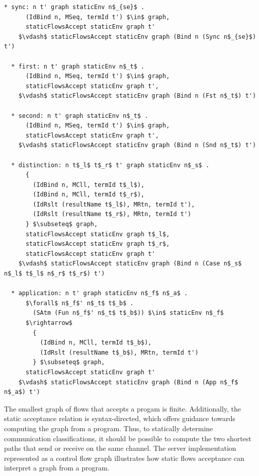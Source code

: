 \documentclass[letterpaper, 11pt]{report}
\begin{document}
\begin{lstlisting}[language=logic, mathescape]
  * sync: n t' graph staticEnv n$_{se}$ .
      (IdBind n, MSeq, termId t') $\in$ graph, 
      staticFlowsAccept staticEnv graph t'
    $\vdash$ staticFlowsAccept staticEnv graph (Bind n (Sync n$_{se}$) t')

  * first: n t' graph staticEnv n$_t$ .
      (IdBind n, MSeq, termId t') $\in$ graph, 
      staticFlowsAccept staticEnv graph t', 
    $\vdash$ staticFlowsAccept staticEnv graph (Bind n (Fst n$_t$) t')

  * second: n t' graph staticEnv n$_t$ .
      (IdBind n, MSeq, termId t') $\in$ graph, 
      staticFlowsAccept staticEnv graph t', 
    $\vdash$ staticFlowsAccept staticEnv graph (Bind n (Snd n$_t$) t')

  * distinction: n t$_l$ t$_r$ t' graph staticEnv n$_s$ .
      {
        (IdBind n, MCll, termId t$_l$),
        (IdBind n, MCll, termId t$_r$),
        (IdRslt (resultName t$_l$), MRtn, termId t'),
        (IdRslt (resultName t$_r$), MRtn, termId t')
      } $\subseteq$ graph, 
      staticFlowsAccept staticEnv graph t$_l$, 
      staticFlowsAccept staticEnv graph t$_r$,
      staticFlowsAccept staticEnv graph t'
    $\vdash$ staticFlowsAccept staticEnv graph (Bind n (Case n$_s$ n$_l$ t$_l$ n$_r$ t$_r$) t')

  * application: n t' graph staticEnv n$_f$ n$_a$ .
      $\forall$ n$_f$' n$_t$ t$_b$ . 
        (SAtm (Fun n$_f$' n$_t$ t$_b$)) $\in$ staticEnv n$_f$ 
      $\rightarrow$
        {
          (IdBind n, MCll, termId t$_b$),
          (IdRslt (resultName t$_b$), MRtn, termId t')
        } $\subseteq$ graph,
      staticFlowsAccept staticEnv graph t'
    $\vdash$ staticFlowsAccept staticEnv graph (Bind n (App n$_f$ n$_a$) t')
\end{lstlisting}

The smallest graph of flows that accepts a progam is finite. Additionally, the static
acceptance relation is syntax-directed, which offers guidance towards computing the graph
from a program. Thus, to statically determine communication classifications, it should
be possible to compute the two shortest paths that send or receive on the same channel. 
The server implementation represented as a control flow graph
illustrates how static flows acceptance can interpret a graph from a program.
\end{document}
